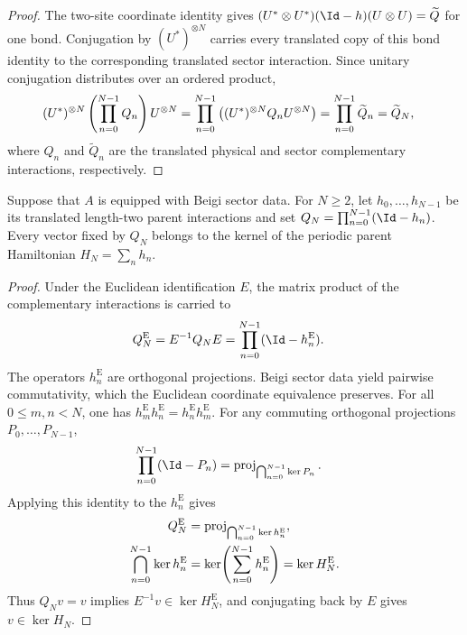 \begin{proof}\leanok
    The two-site coordinate identity gives
    $(U^*\otimes U^*)(\Id-h)(U\otimes U)=\widetilde Q$ for one bond.
    Conjugation by $(U^*)^{\otimes N}$ carries every translated copy of this
    bond identity to the corresponding translated sector interaction. Since
    unitary conjugation distributes over an ordered product,
    \begin{align}
        (U^*)^{\otimes N}
        \left(\prod_{n=0}^{N-1}Q_n\right)
        U^{\otimes N}
         & =
        \prod_{n=0}^{N-1}
        \left((U^*)^{\otimes N}Q_nU^{\otimes N}\right) =
        \prod_{n=0}^{N-1}\widetilde Q_n =
        \widetilde Q_N, \notag
    \end{align}
    where $Q_n$ and $\widetilde Q_n$ are the translated physical and sector
    complementary interactions, respectively.
\end{proof}

\begin{lemma}
    \label{thm:beigi_complement_product_fixed_vector}
    \leanok
    Suppose that $A$ is equipped with Beigi sector data. For $N\geq2$, let
    $h_0,\ldots,h_{N-1}$ be its translated length-two parent interactions and
    set $Q_N=\prod_{n=0}^{N-1}(\Id-h_n)$. Every vector fixed by $Q_N$
    belongs to the kernel of the periodic parent Hamiltonian
    $H_N=\sum_n h_n$.
\end{lemma}

\begin{proof}\leanok
    Under the Euclidean identification $E$, the matrix product of the
    complementary interactions is carried to
    \begin{align}
        Q_N^{\mathrm{E}}
         & =
        E^{-1}Q_NE =
        \prod_{n=0}^{N-1}(\Id-h_n^{\mathrm{E}}). \notag
    \end{align}
    The operators $h_n^{\mathrm{E}}$ are orthogonal projections. Beigi sector
    data yield pairwise commutativity, which the Euclidean coordinate equivalence preserves.
    For all $0\leq m,n<N$, one has
    $h_m^{\mathrm{E}}h_n^{\mathrm{E}}
        =h_n^{\mathrm{E}}h_m^{\mathrm{E}}$. For any commuting orthogonal
    projections $P_0,\ldots,P_{N-1}$,
    \begin{align}
        \prod_{n=0}^{N-1}(\Id-P_n)
         & =
        \operatorname{proj}_{\bigcap_{n=0}^{N-1}\ker P_n}. \notag
    \end{align}
    Applying this identity to the $h_n^{\mathrm{E}}$ gives
    \begin{align}
        Q_N^{\mathrm{E}}
         & =
        \operatorname{proj}_{\bigcap_{n=0}^{N-1}\ker h_n^{\mathrm{E}}},
        \notag \\
        \bigcap_{n=0}^{N-1}\ker h_n^{\mathrm{E}}
         & =
        \ker\!\left(\sum_{n=0}^{N-1}h_n^{\mathrm{E}}\right) =
        \ker H_N^{\mathrm{E}}. \notag
    \end{align}
    Thus $Q_Nv=v$ implies $E^{-1}v\in\ker H_N^{\mathrm{E}}$, and conjugating
    back by $E$ gives $v\in\ker H_N$.
\end{proof}

